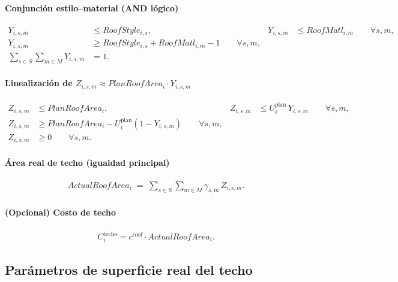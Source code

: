 \paragraph{Conjunción estilo–material (AND lógico)}
\begin{align}
Y_{i,s,m} &\le RoofStyle_{i,s}, &
Y_{i,s,m} &\le RoofMatl_{i,m} \qquad \forall s,m,\\
Y_{i,s,m} &\ge RoofStyle_{i,s} + RoofMatl_{i,m} - 1 \qquad \forall s,m,\\
\sum_{s\in S}\sum_{m\in M} Y_{i,s,m} &= 1.
\end{align}

\paragraph{Linealización de $Z_{i,s,m}\approx PlanRoofArea_i\cdot Y_{i,s,m}$}
\begin{align}
Z_{i,s,m} &\le PlanRoofArea_i, &
Z_{i,s,m} &\le U^{\text{plan}}_i\, Y_{i,s,m} \qquad \forall s,m,\\
Z_{i,s,m} &\ge PlanRoofArea_i - U^{\text{plan}}_i(1 - Y_{i,s,m}) \qquad \forall s,m,\\
Z_{i,s,m} &\ge 0 \qquad \forall s,m.
\end{align}

\paragraph{Área real de techo (igualdad principal)}
\begin{align}
ActualRoofArea_i \;=\; \sum_{s\in S}\sum_{m\in M} \gamma_{s,m}\, Z_{i,s,m}.
\end{align}

\paragraph{(Opcional) Costo de techo}
\begin{align}
C^{\text{techo}}_i = c^{\text{roof}} \cdot ActualRoofArea_i.
\end{align}

\subsection*{Parámetros de superficie real del techo}

